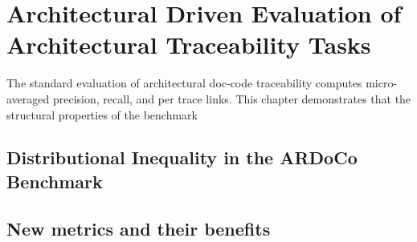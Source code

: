 \section{Architectural Driven Evaluation of Architectural Traceability Tasks}
\label{sec:metric}
The standard evaluation of architectural doc-code traceability computes micro-averaged precision, recall, and \fone per trace links.
This chapter demonstrates that the structural properties of the benchmark
\subsection{Distributional Inequality in the ARDoCo Benchmark}
\label{sec:metric:prestudy}
\subsection{New metrics and their benefits}
\label{sec:metric:suite}
